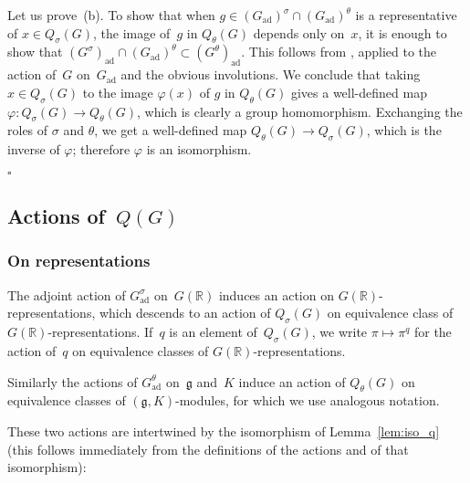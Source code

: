 \documentclass[10pt,leqno]{article}
\numberwithin{equation}{section}
\newcommand{\qed}{\hfill $\square$ \medskip}
\newcommand{\ad}{\mathrm{ad}}
\newcommand{\Gad}{G_\mathrm{ad}}
\newcommand{\R}{\mathbb R}
\newcommand{\g}{\mathfrak g}
\begin{document}
Let us prove~(b). To show that when $g\in (\Gad)^\sigma \cap (\Gad)^\theta$ is a representative of $x \in Q_{\sigma}(G)$,  the image of~$g$ in  $Q_\theta(G)$ depends only on~$x$, it is enough to show that  $(G^\sigma)_\ad \cap (\Gad)^\theta \subset (G^\theta)_{\ad}$. This follows from \cite[Proposition 5.4]{galois}, applied to the action of~$G$ on~$\Gad$ and the obvious involutions. We conclude that taking $x \in Q_{\sigma}(G)$ to the image $\varphi(x)$ of $g$ in $Q_{\theta}(G)$ gives a well-defined map $\varphi\colon Q_{\sigma}(G)\to Q_{\theta}(G)$, which is clearly a group homomorphism. Exchanging the roles of $\sigma$ and $\theta$, we get a well-defined map $Q_{\theta}(G) \to Q_{\sigma}(G)$, which is the inverse of $\varphi$; therefore $\varphi$ is an isomorphism.

\qed


%


\subsection{Actions of~$Q(G)$}


\subsubsection*{On representations} 



The adjoint action of $\Gad^\sigma$ on~$G(\R)$ induces an action on $G(\R)$-representations, which descends to an action of  $Q_\sigma(G)$ on equivalence class of $G(\R)$-representations. If~$q$ is an element of~$Q_\sigma(G)$, we write $\pi \mapsto \pi^q$ for the action of~$q$ on equivalence classes of $G(\R)$-representations. 

Similarly the actions of $\Gad^\theta$ on~$\g$ and~$K$ induce an action of $Q_\theta(G)$ on equivalence classes of $(\g,K)$-modules, for which we use analogous notation.

These two actions are intertwined by the isomorphism of Lemma~\ref{lem:iso_q} (this follows immediately from the definitions of the actions and of that isomorphism): 
\end{document}
